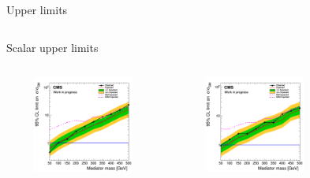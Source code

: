 \documentclass[8pt]{beamer}
\begin{document}
\begin{frame}{Upper limits}
\begin{columns}
\begin{column}{1.09\textwidth}
\begin{block}{\centering Scalar upper limits}\end{block}
\end{column}
\end{columns} \vspace{-5pt}
\begin{columns}
		\begin{column}{0.33\textwidth}
			\begin{center}
			\vspace{-8pt}
			\begin{block}{}\end{block} \vspace{-10pt}
     			\includegraphics[width=1.0\textwidth, height=90pt]{figs/limit_scalar_2016_attempt7.png}
    		\end{center}		
		\end{column} 
		\begin{column}{0.33\textwidth}
			\begin{center}
			\vspace{-8pt}
			\begin{block}{}\end{block} \vspace{-10pt}
     			\includegraphics[width=1.0\textwidth, height=90pt]{figs/limit_scalar_2017_attempt7.png}
    		\end{center}		
		\end{column} 
		\begin{column}{0.33\textwidth}
			\begin{center}
			\vspace{-8pt}
			\begin{block}{}\end{block} \vspace{-10pt}

\end{center}
\end{column}
\end{columns}
\end{frame}
\end{document}
